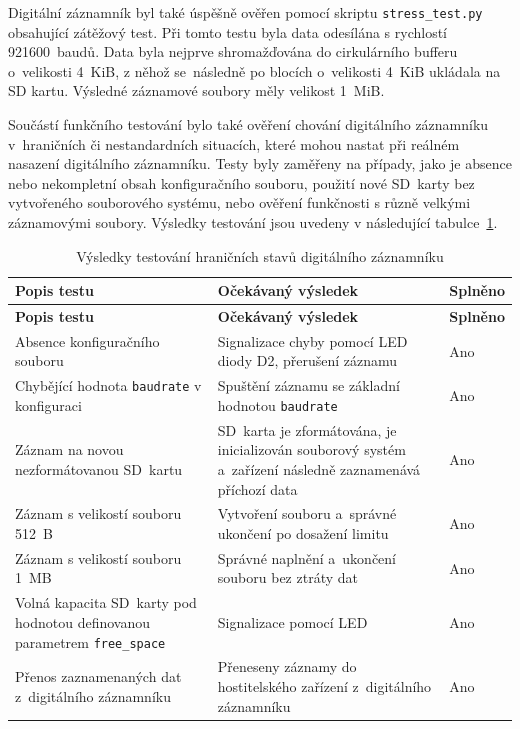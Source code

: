 Digitální záznamník byl také úspěšně ověřen pomocí skriptu \texttt{stress\_test.py} obsahující zátěžový test. Při tomto testu byla data odesílána s rychlostí 921600~baudů. Data byla nejprve shromažďována do cirkulárního bufferu o~velikosti 4~KiB, z něhož se~následně po blocích o~velikosti 4~KiB ukládala na SD kartu. Výsledné záznamové soubory měly velikost 1~MiB.

Součástí funkčního testování bylo také ověření chování digitálního záznamníku v~hraničních
či nestandardních situacích, které mohou nastat při reálném nasazení digitálního
záznamníku. Testy byly zaměřeny na případy, jako je absence nebo nekompletní obsah konfiguračního
souboru, použití nové SD~karty bez vytvořeného souborového systému, nebo
ověření funkčnosti s různě velkými záznamovými soubory. Výsledky testování jsou uvedeny
v následující tabulce~\ref{tab:test-extremes}.

\begin{longtable}{|p{6cm}|p{5cm}|p{2.5cm}|}
    \caption{Výsledky testování hraničních stavů digitálního záznamníku}
    \label{tab:test-extremes} \\
    \hline
    \textbf{Popis testu} & \textbf{Očekávaný výsledek} & \textbf{Splněno} \\
    \hline
    \endfirsthead

    \hline
    \textbf{Popis testu} & \textbf{Očekávaný výsledek} & \textbf{Splněno} \\
    \hline
    \endhead

    \hline
    \endfoot

    \hline
    \endlastfoot

    Absence konfiguračního souboru & Signalizace chyby pomocí LED diody D2, přerušení záznamu & Ano \\
    \hline
    Chybějící hodnota \texttt{baudrate} v konfiguraci & Spuštění záznamu se základní hodnotou \texttt{baudrate} & Ano \\
    \hline
    Záznam na novou nezformátovanou SD~kartu & SD~karta je zformátována, je inicializován souborový systém a~zařízení následně zaznamenává příchozí data & Ano \\
    \hline
    Záznam s velikostí souboru 512~B & Vytvoření souboru a~správné ukončení po dosažení limitu & Ano \\
    \hline
    Záznam s velikostí souboru 1~MB & Správné naplnění a~ukončení souboru bez ztráty dat & Ano \\
    \hline
    Volná kapacita SD~karty pod hodnotou definovanou parametrem \texttt{free\_space} & Signalizace pomocí LED & Ano \\
    \hline
    Přenos zaznamenaných dat z~digitálního záznamníku & Přeneseny záznamy do hostitelského zařízení z~digitálního záznamníku & Ano \\
    \hline
\end{longtable}

